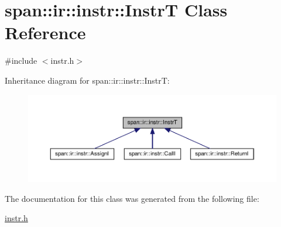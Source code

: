 \hypertarget{classspan_1_1ir_1_1instr_1_1InstrT}{}\section{span\+:\+:ir\+:\+:instr\+:\+:InstrT Class Reference}
\label{classspan_1_1ir_1_1instr_1_1InstrT}


{\ttfamily \#include $<$instr.\+h$>$}



Inheritance diagram for span\+:\+:ir\+:\+:instr\+:\+:InstrT\+:\nopagebreak
\begin{figure}[H]
\begin{center}
\leavevmode
\includegraphics[width=350pt]{classspan_1_1ir_1_1instr_1_1InstrT__inherit__graph}
\end{center}
\end{figure}


The documentation for this class was generated from the following file\+:\begin{DoxyCompactItemize}
\item 
\hyperlink{instr_8h}{instr.\+h}\end{DoxyCompactItemize}
